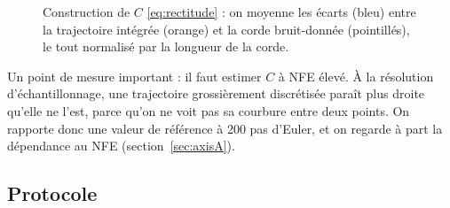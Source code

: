 \documentclass[11pt]{article}
\begin{document}
\begin{figure}[htbp]
\centering
{}
\caption{Construction de $C$ \eqref{eq:rectitude} : on moyenne les écarts (bleu) entre la trajectoire
intégrée (orange) et la corde bruit-donnée (pointillés), le tout normalisé par la longueur de la corde.}
\label{fig:rectitude}
\end{figure}

Un point de mesure important : il faut estimer $C$ à NFE élevé. À la résolution d'échantillonnage, une
trajectoire grossièrement discrétisée paraît plus droite qu'elle ne l'est, parce qu'on ne voit pas sa
courbure entre deux points. On rapporte donc une valeur de référence à 200 pas d'Euler, et on regarde à part
la dépendance au NFE (section~\ref{sec:axisA}).

\subsection{Protocole}
\label{sec:protocol}
\end{document}
